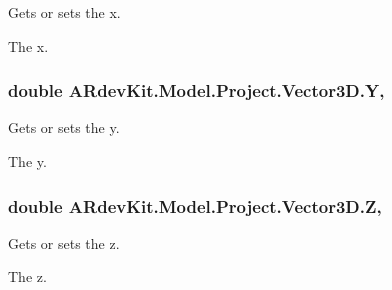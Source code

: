 Gets or sets the x. 

The x. \hypertarget{class_a_rdev_kit_1_1_model_1_1_project_1_1_vector3_d_aaa8679d7364c8f6ba03e89bd00f5b991}{
\subsubsection[{Y}]{\setlength{\rightskip}{0pt plus 5cm}double A\-Rdev\-Kit.\-Model.\-Project.\-Vector3\-D.\-Y\hspace{0.3cm}{\ttfamily [get]}, {\ttfamily [set]}}}\label{class_a_rdev_kit_1_1_model_1_1_project_1_1_vector3_d_aaa8679d7364c8f6ba03e89bd00f5b991}


Gets or sets the y. 

The y. \hypertarget{class_a_rdev_kit_1_1_model_1_1_project_1_1_vector3_d_a75ca41666b67f93861f074e13964e946}{
\subsubsection[{Z}]{\setlength{\rightskip}{0pt plus 5cm}double A\-Rdev\-Kit.\-Model.\-Project.\-Vector3\-D.\-Z\hspace{0.3cm}{\ttfamily [get]}, {\ttfamily [set]}}}\label{class_a_rdev_kit_1_1_model_1_1_project_1_1_vector3_d_a75ca41666b67f93861f074e13964e946}


Gets or sets the z. 

The z. 